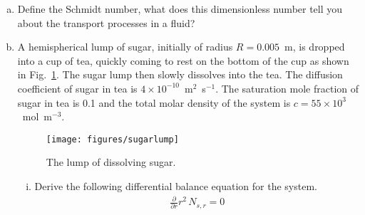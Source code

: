 \documentclass[calculator,datasheet,handbook]{exam}
\begin{document}
\begin{question}\vspace{-2\baselineskip}
  \begin{enumerate}[a)]
  \item Define the Schmidt number, what does this dimensionless number
    tell you about the transport processes in a fluid?
  \item A hemispherical lump of sugar, initially of radius
    $R=0.005$~m, is dropped into a cup of tea, quickly coming to rest
    on the bottom of the cup as shown in Fig.~\ref{fig:sugar}. The
    sugar lump then slowly dissolves into the tea. The diffusion
    coefficient of sugar in tea is
    $4\times10^{-10}$~m${}^2$~s${}^{-1}$. The saturation mole fraction
    of sugar in tea is 0.1 and the total molar density of the system
    is $c=55\times10^3$~mol~m${}^{-3}$.
    \begin{figure}[ht]%
      \begin{center}%
        \texttt{[image: figures/sugarlump]}
      \end{center}
      \caption{\label{fig:sugar}The lump of dissolving sugar.}
    \end{figure}
    \begin{enumerate}[i)] 
    \item Derive the following differential balance equation for the system.%
      \begin{align*}
        \frac{\partial }{\partial r} r^2\,N_{s,r} = 0
      \end{align*}
\end{enumerate}
\end{enumerate}
\end{question}
\end{document}
